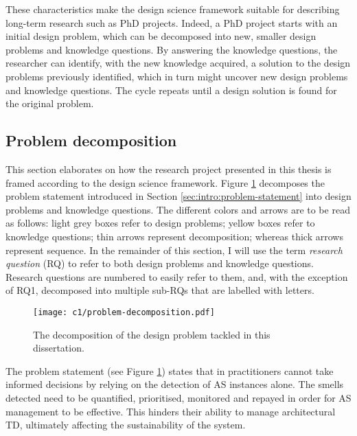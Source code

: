 These characteristics make the design science framework suitable for describing long-term research such as PhD projects.
Indeed, a PhD project starts with an initial design problem, which can be decomposed into new, smaller design problems and knowledge questions.
By answering the knowledge questions, the researcher can identify, with the new knowledge acquired, a solution to the design problems previously identified, which in turn might uncover new design problems and knowledge questions.
The cycle repeats until a design solution is found for the original problem.

\subsection{Problem decomposition}
This section elaborates on how the research project presented in this thesis is framed according to the design science framework. 
Figure \ref{fig:intro:problem-decomposition} decomposes the problem statement introduced in Section \ref{sec:intro:problem-statement} into design problems and knowledge questions.
The different colors and arrows are to be read as follows: light grey boxes refer to design problems; yellow boxes refer to knowledge questions; thin arrows represent decomposition; whereas thick arrows represent sequence.
In the remainder of this section, I will use the term \emph{research question} (RQ) to refer to both design problems and knowledge questions.
Research questions are numbered to easily refer to them, and, with the exception of RQ1, decomposed into multiple sub-RQs that are labelled with letters.

\begin{figure}
    \centering
    \texttt{[image: c1/problem-decomposition.pdf]}
    \caption{The decomposition of the design problem tackled in this dissertation.}\label{fig:intro:problem-decomposition}
\end{figure}

The problem statement (see Figure \ref{fig:intro:problem-decomposition}) states that in practitioners cannot take informed decisions by relying on the detection of AS instances alone.
The smells detected need to be quantified, prioritised, monitored and repayed in order for AS management to be effective.
This hinders their ability to manage architectural TD, ultimately affecting the sustainability of the system.

